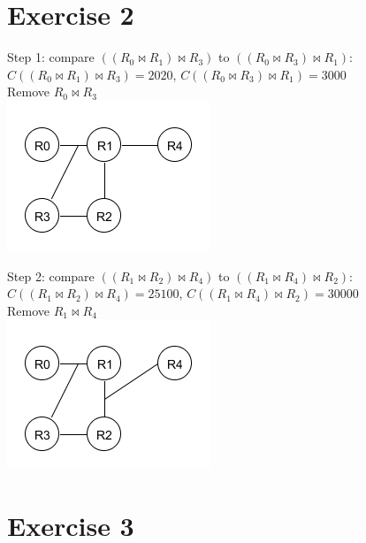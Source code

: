 \documentclass[11pt,a4paper]{scrartcl}
\begin{document}
\section*{Exercise 2}

Step 1: compare $((R_0 \Join R_1) \Join R_3)$ to $((R_0 \Join R_3) \Join R_1)$:\\
$C((R_0 \Join R_1) \Join R_3)=2020$, $C((R_0 \Join R_3) \Join R_1)=3000$\\
Remove $R_0 \Join R_3$\\
\includegraphics{graph/step1}

Step 2: compare $((R_1 \Join R_2) \Join R_4)$ to $((R_1 \Join R_4) \Join R_2)$:\\
$C((R_1 \Join R_2) \Join R_4)=25100$, $C((R_1 \Join R_4) \Join R_2)=30000$\\
Remove $R_1 \Join R_4$\\
\includegraphics{graph/step2}

\section*{Exercise 3}
\end{document}
